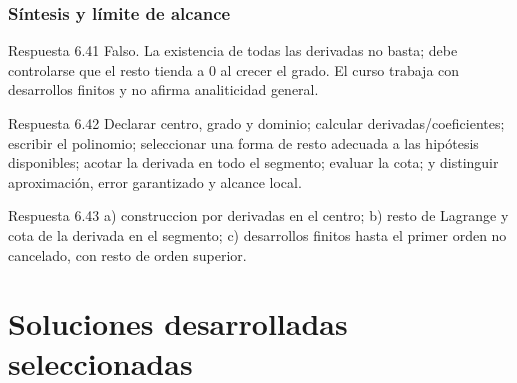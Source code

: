\documentclass[10pt,a4paper,oneside,openany]{book}
\begin{document}
\section{Síntesis y límite de alcance}
\begin{PSevenAnswerFixed}{Respuesta 6.41}
Falso. La existencia de todas las derivadas no basta; debe controlarse que el resto tienda a \(0\) al crecer el grado. El curso trabaja con desarrollos finitos y no afirma analiticidad general.
\end{PSevenAnswerFixed}
\begin{PSevenAnswerFixed}{Respuesta 6.42}
Declarar centro, grado y dominio; calcular derivadas/coeficientes; escribir el polinomio; seleccionar una forma de resto adecuada a las hipótesis disponibles; acotar la derivada en todo el segmento; evaluar la cota; y distinguir aproximación, error garantizado y alcance local.
\end{PSevenAnswerFixed}
\begin{PSevenAnswerFixed}{Respuesta 6.43}
a) construccion por derivadas en el centro; b) resto de Lagrange y cota de la derivada en el segmento; c) desarrollos finitos hasta el primer orden no cancelado, con resto de orden superior.
\end{PSevenAnswerFixed}
\part{Soluciones desarrolladas seleccionadas}
\end{document}
